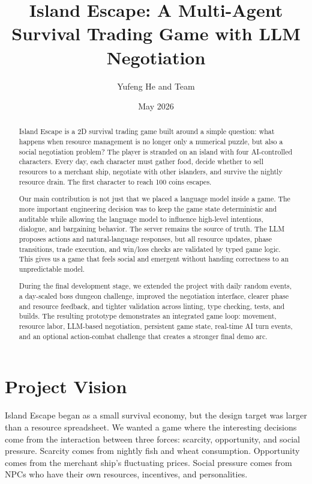 \documentclass[11pt]{article}
\title{Island Escape: A Multi-Agent Survival Trading Game with LLM Negotiation}
\author{Yufeng He and Team}
\date{May 2026}
\begin{document}
\maketitle

\begin{abstract}
Island Escape is a 2D survival trading game built around a simple question:
what happens when resource management is no longer only a numerical puzzle, but
also a social negotiation problem? The player is stranded on an island with four
AI-controlled characters. Every day, each character must gather food, decide
whether to sell resources to a merchant ship, negotiate with other islanders,
and survive the nightly resource drain. The first character to reach 100 coins
escapes.

Our main contribution is not just that we placed a language model inside a game.
The more important engineering decision was to keep the game state deterministic
and auditable while allowing the language model to influence high-level
intentions, dialogue, and bargaining behavior. The server remains the source of
truth. The LLM proposes actions and natural-language responses, but all resource
updates, phase transitions, trade execution, and win/loss checks are validated
by typed game logic. This gives us a game that feels social and emergent without
handing correctness to an unpredictable model.

During the final development stage, we extended the project with daily random
events, a day-scaled boss dungeon challenge, improved the negotiation interface,
clearer phase and resource feedback, and tighter validation across linting, type
checking, tests, and builds. The resulting prototype demonstrates an integrated
game loop: movement, resource labor, LLM-based negotiation, persistent game
state, real-time AI turn events, and an optional action-combat challenge that
creates a stronger final demo arc.
\end{abstract}

\section{Project Vision}

Island Escape began as a small survival economy, but the design target was
larger than a resource spreadsheet. We wanted a game where the interesting
decisions come from the interaction between three forces: scarcity, opportunity,
and social pressure. Scarcity comes from nightly fish and wheat consumption.
Opportunity comes from the merchant ship's fluctuating prices. Social pressure
comes from NPCs who have their own resources, incentives, and personalities.
\end{document}
